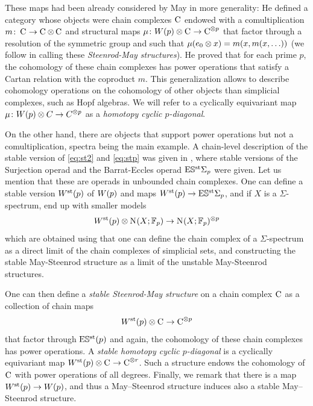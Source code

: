 These maps had been already considered by May \cite{may1970general} in more generality: He defined a category whose objects were chain complexes $\operatorname{C}_{}$ endowed with a comultiplication $m\colon \operatorname{C}_{}\to \operatorname{C}_{}\otimes \operatorname{C}_{}$ and structural maps $\mu\colon W(p)\otimes \operatorname{C}_{}\to \operatorname{C}_{}^{\otimes p}$ that factor through a resolution of the symmetric group and such that $\mu(e_0\otimes x) = m(x, m(x,\ldots))$ (we follow \cite{medina2021may_st} in calling these \emph{Steenrod-May structures}). He proved that for each prime $p$, the cohomology of these chain complexes has power operations that satisfy a Cartan relation with the coproduct $m$. This generalization allows to describe cohomology operations on the cohomology of other objects than simplicial complexes, such as Hopf algebras. We will refer to a cyclically equivariant map $\mu\colon W(p)\otimes C\to C^{\otimes p}$ as a \emph{homotopy cyclic $p$-diagonal}.

On the other hand, there are objects that support power operations but not a comultiplication, spectra being the main example. A chain-level description of the stable version of \eqref{eq:st2} and \eqref{eq:stp} was given in \cite{Gill2020}, where stable versions of the Surjection operad and the Barrat-Eccles operad $\mathrm{E}\mathbb{S}^{\mathrm{st}}\Sigma_p$ were given. Let us mention that these are operads in unbounded chain complexes. One can define a stable version $W^{\mathrm{st}}_{}(p)$ of $W(p)$ and maps $W^{\mathrm{st}}_{}(p)\to \mathrm{E}\mathbb{S}^{\mathrm{st}}\Sigma_p$, and if $X$ is a $\Sigma$-spectrum, end up with smaller models
\[
 W^{\mathrm{st}}_{}(p)\otimes \operatorname{N}_{}(X;\mathbb{F}_p)\to \operatorname{N}_{}(X;\mathbb{F}_p)^{\otimes p}
\]
which are obtained using that one can define the chain complex of a $\Sigma$-spectrum as a direct limit of the chain complexes of simplicial sets, and constructing the stable May-Steenrod structure as a limit of the unstable May-Steenrod structures.

One can then define a \emph{stable Steenrod-May structure} on a chain complex $\operatorname{C}_{}$ as a collection of chain maps
\begin{equation}\label{eq:tatediag}
W^{\mathrm{st}}_{}(p)\otimes \operatorname{C}_{}\to \operatorname{C}_{}^{\otimes p}
\end{equation}
that factor through $\mathrm{E}\mathbb{S}^{\mathrm{st}}(p)$ and again, the cohomology of these chain complexes has power operations. A \emph{stable homotopy cyclic $p$-diagonal} is a cyclically equivariant map $W^{\mathrm{st}}_{}(p)\otimes \operatorname{C}_{}\to \operatorname{C}_{}^{\otimes r}$. Such a structure endows the cohomology of $\operatorname{C}_{}$ with power operations of all degrees. Finally, we remark that there is a map $W^{\mathrm{st}}_{}(p)\to W(p)$, and thus a May--Steenrod structure induces also a stable May--Steenrod structure. 

